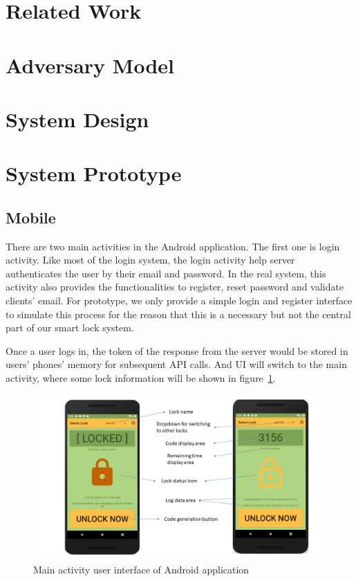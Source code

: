 \documentclass[conference]{IEEEtran}
\begin{document}
\section{Related Work}

\section{Adversary Model}

\section{System Design}

\section{System Prototype}

\subsection{Mobile}
There are two main activities in the Android application. The first one is login activity. Like most of the login system, the login activity help server authenticates the user by their email and password. In the real system, this activity also provides the functionalities to register, reset password and validate clients’ email. For prototype, we only provide a simple login and register interface to simulate this process for the reason that this is a necessary but not the central part of our smart lock system.

Once a user logs in, the token of the response from the server would be stored in users’ phones’ memory for subsequent API calls. And UI will switch to the main activity, where some lock information will be shown in figure~\ref{fig:mainActivity}.

\begin{figure}[h]
\centerline{\includegraphics[width=\textwidth]{img/MainActivity.png}}
\caption{Main activity user interface of Android application}
\label{fig:mainActivity}
\end{figure}
\end{document}
